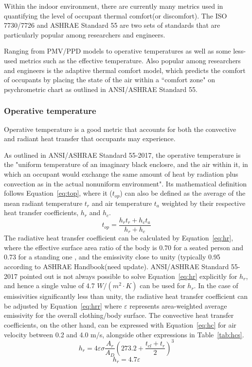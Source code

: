 Within the indoor environment, there are currently many metrics used in quantifying the level of occupant thermal comfort(or discomfort). The ISO 7730/7726 and ASHRAE Standard 55 are two sets of standards that are particularly popular among researchers and engineers.

Ranging from PMV/PPD models to operative temperatures as well as some less-used metrics such as the effective temperature. Also popular among researchers and engineers is the adaptive thermal comfort model, which predicts the comfort of occupants by placing the state of the air within a ``comfort zone" on psychrometric chart as outlined in ANSI/ASHRAE Standard 55\cite{ashrae_ansi/ashrae_2013}.
\subsubsection{Operative temperature}
    Operative temperature is a good metric that accounts for both the convective and radiant heat transfer that occupants may experience.%

    As outlined in ANSI/ASHRAE Standard 55-2017, the operative temperature is the "uniform temperature of an imaginary black enclosre, and the air within it, in which an occupant would exchange the same amount of heat by radiation plus convection as in the actual nonuniform environment". Its mathematical definition follows Equation~\ref{eq:top}, where it ($t_{op}$) can also be defined as the average of the mean radiant temperature $t_r$ and air temperature $t_a$ weighted by their respective heat transfer coefficients, $h_r$ and $h_c$.
        \begin{equation}
            t_{op} = \frac{h_r t_r + h_c t_a}{h_r + h_c}\label{eq:top}
        \end{equation}
    The radiative heat transfer coefficient can be calculated by Equation~\ref{eq:hr}, where the effective surface area ratio of the body is 0.70 for a seated person and 0.73 for a standing one \cite{fanger_calculation_1967}, and the emissivity close to unity (typically 0.95 according to ASHRAE Handbook\cite{ashrae_thermal_2003}(need update). ANSI/ASHRAE Standard 55-2017 pointed out is not always possible to solve Equation~\ref{eq:hr} explicitly for $h_r$, and hence a single value of 4.7 $W/(m^2\cdot K)$ can be used for $h_r$\cite{ansi/ashrae_standard_2017}. In the case of emissivities significantly less than unity, the radiative heat transfer coefficient can be adjusted by Equation~\ref{eq:hrr} where $\varepsilon$ represents area-weighted average emissivity for the overall clothing/body surface. The convective heat transfer coefficients, on the other hand, can be expressed with Equation~\ref{eq:hc} for air velocity between 0.2 and 4.0 m/s, alongside other expressions in Table~\ref{tab:hcs}.
        \begin{equation}
            h_r = 4\varepsilon \sigma \frac{A_r}{A_D} (273.2+ \frac{t_{cl}+t_r}{2})^3\label{eq:hr}
        \end{equation}
        \begin{equation}
            h_r = 4.7\varepsilon\label{eq:hrr}
        \end{equation}

